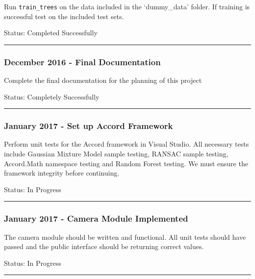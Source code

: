 \documentclass[12pt]{article}
\begin{document}
Run \texttt{train\_trees} on the data included in the `dummy\_data'
folder. If training is successful test on the included test sets.

Status: Completed Successfully

\begin{center}\rule{0.5\linewidth}{\linethickness}\end{center}

\subsubsection{December 2016 - Final
Documentation}\label{december-2016---final-documentation}

Complete the final documentation for the planning of this project

Status: Completely Successfully

\begin{center}\rule{0.5\linewidth}{\linethickness}\end{center}

\subsubsection{January 2017 - Set up Accord
Framework}\label{january-2017---set-up-accord-framework}

Perform unit tests for the Accord framework in Visual Studio. All
necessary tests include Gaussian Mixture Model sample testing, RANSAC
sample testing, Accord.Math namespace testing and Random Forest testing.
We must ensure the framework integrity before continuing.

Status: In Progress

\begin{center}\rule{0.5\linewidth}{\linethickness}\end{center}

\subsubsection{January 2017 - Camera Module
Implemented}\label{january-2017---camera-module-implemented}

The camera module should be written and functional. All unit tests
should have passed and the public interface should be returning correct
values.

Status: In Progress

\begin{center}\rule{0.5\linewidth}{\linethickness}\end{center}
\end{document}
